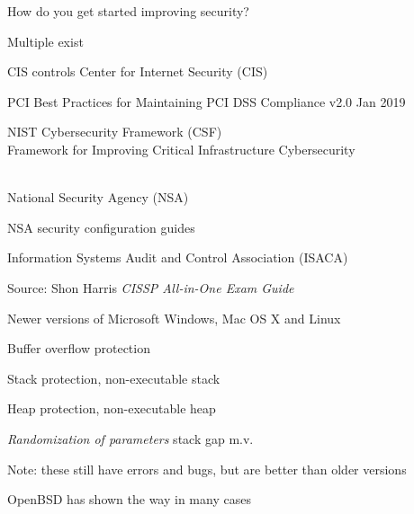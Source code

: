 \documentclass[Screen16to9,17pt]{foils}
\begin{document}
How do you get started improving security?



\begin{list1}
\item Multiple exist
\vskip 1cm
\begin{list2}
\item CIS controls Center for Internet Security (CIS) 
\item PCI Best Practices for Maintaining PCI DSS Compliance v2.0 Jan 2019
\item NIST Cybersecurity Framework (CSF)\\
Framework for Improving
Critical Infrastructure Cybersecurity\\ \\
\item National Security Agency (NSA)\\ 
\item NSA security configuration guides\\ 
\item Information Systems Audit and Control Association (ISACA)\\
\end{list2}
\end{list1}




Source: Shon Harris \emph{CISSP All-in-One Exam Guide}



\begin{list1}
\item Newer versions of Microsoft Windows, Mac OS X and Linux
\begin{list2}
\item Buffer overflow protection
\item Stack protection, non-executable stack
\item Heap protection, non-executable heap
\item \emph{Randomization of parameters} stack gap m.v.
\end{list2}
\item Note: these still have errors and bugs, but are better than older versions
\item OpenBSD has shown the way in many cases\\ 
\end{list1}
\end{document}
